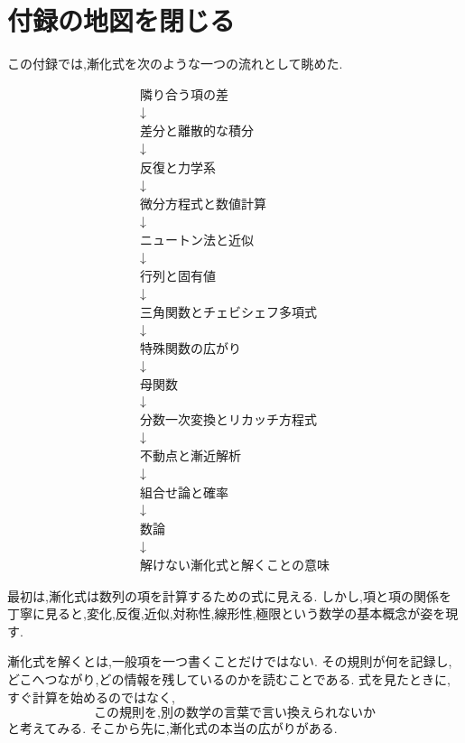 
\section{付録の地図を閉じる}

この付録では,漸化式を次のような一つの流れとして眺めた.

\[
  \begin{array}{c}
    \text{隣り合う項の差}        \\
    \downarrow            \\
    \text{差分と離散的な積分}      \\
    \downarrow            \\
    \text{反復と力学系}         \\
    \downarrow            \\
    \text{微分方程式と数値計算}     \\
    \downarrow            \\
    \text{ニュートン法と近似}      \\
    \downarrow            \\
    \text{行列と固有値}         \\
    \downarrow            \\
    \text{三角関数とチェビシェフ多項式} \\
    \downarrow            \\
    \text{特殊関数の広がり}       \\
    \downarrow            \\
    \text{母関数}            \\
    \downarrow            \\
    \text{分数一次変換とリカッチ方程式} \\
    \downarrow            \\
    \text{不動点と漸近解析}       \\
    \downarrow            \\
    \text{組合せ論と確率}        \\
    \downarrow            \\
    \text{数論}             \\
    \downarrow            \\
    \text{解けない漸化式と解くことの意味}
  \end{array}
\]

最初は,漸化式は数列の項を計算するための式に見える.
しかし,項と項の関係を丁寧に見ると,変化,反復,近似,対称性,線形性,極限という数学の基本概念が姿を現す.

漸化式を解くとは,一般項を一つ書くことだけではない.
その規則が何を記録し,どこへつながり,どの情報を残しているのかを読むことである.
式を見たときに,すぐ計算を始めるのではなく,
\[
  \text{この規則を,別の数学の言葉で言い換えられないか}
\]
と考えてみる.
そこから先に,漸化式の本当の広がりがある.
